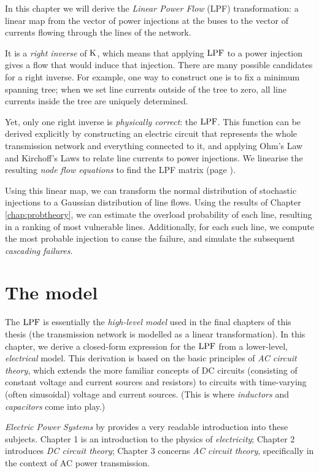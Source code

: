 \documentclass[main.tex]{subfiles}
\begin{document}
In this chapter we will derive the \emph{Linear Power Flow} (LPF) transformation: a linear map from the vector of power injections at the buses to the vector of currents flowing through the lines of the network.

It is a \emph{right inverse} of $\text{\textup{K}}$, which means that applying $\text{\textup{LPF}}$ to a power injection gives a flow that would induce that injection. There are many possible candidates for a right inverse. For example, one way to construct one is to fix a minimum spanning tree; when we set line currents outside of the tree to zero, all line currents inside the tree are uniquely determined.

Yet, only one right inverse is \emph{physically correct}: the $\text{\textup{LPF}}$. This function can be derived explicitly by constructing an electric circuit that represents the whole transmission network and everything connected to it, and applying Ohm's Law and Kirchoff's Laws to relate line currents to power injections. We linearise the resulting \emph{node flow equations} to find the LPF matrix (page \pageref{eq:LPF}).

Using this linear map, we can transform the normal distribution of stochastic injections to a Gaussian distribution of line flows. Using the results of Chapter \ref{chap:probtheory}, we can estimate the overload probability of each line, resulting in a ranking of most vulnerable lines. Additionally, for each such line, we compute the most probable injection to cause the failure, and simulate the subsequent \emph{cascading failures}.

\section{The model}
The $\text{\textup{LPF}}$ is essentially the \emph{high-level model} used in the final chapters of this thesis (\ie the transmission network is modelled as a linear transformation). In this chapter, we derive a closed-form expression for the $\text{\textup{LPF}}$ from a lower-level, \emph{electrical} model. This derivation is based on the basic principles of \emph{AC circuit theory}, which extends the more familiar concepts of DC circuits (consisting of constant voltage and current sources and resistors) to circuits with time-varying (often sinusoidal) voltage and current sources. (This is where \emph{inductors} and \emph{capacitors} come into play.)

\emph{Electric Power Systems} by \cite{VonMeier2006} provides a very readable introduction into these subjects. Chapter 1 is an introduction to the physics of \emph{electricity}; Chapter 2 introduces \emph{DC circuit theory}; Chapter 3 concerns \emph{AC circuit theory}, specifically in the context of AC power transmission. 
\end{document}

